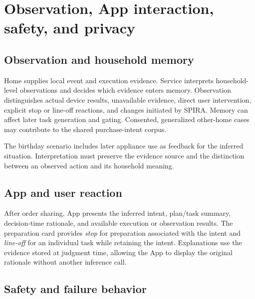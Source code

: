\section{Observation, App interaction, safety, and privacy}
\label{sec:observation}

\subsection{Observation and household memory}

Home supplies local event and execution evidence. Service interprets household-level observations and decides which evidence enters memory. Observation distinguishes actual device results, unavailable evidence, direct user intervention, explicit stop or line-off reactions, and changes initiated by SPIRA. Memory can affect later task generation and gating. Consented, generalized other-home cases may contribute to the shared purchase-intent corpus. 

The birthday scenario includes later appliance use as feedback for the inferred situation. Interpretation must preserve the evidence source and the distinction between an observed action and its household meaning.  

\subsection{App and user reaction}

After order sharing, App presents the inferred intent, plan/task summary, decision-time rationale, and available execution or observation results. The preparation card provides \emph{stop} for preparation associated with the intent and \emph{line-off} for an individual task while retaining the intent. Explanations use the evidence stored at judgment time, allowing the App to display the original rationale without another inference call. 


\subsection{Safety and failure behavior}

